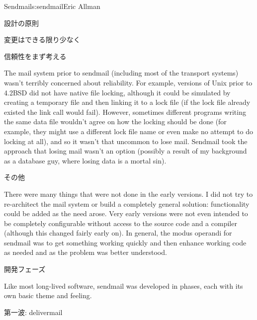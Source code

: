 \begin{aosachapter}{Sendmail}{s:sendmail}{Eric Allman}
\begin{aosasect1}{設計の原則}
\begin{aosasect2}{変更はできる限り少なく}
\end{aosasect2}

\begin{aosasect2}{信頼性をまず考える}

The mail system prior to sendmail (including most of the transport
systems) wasn't terribly concerned about reliability. For example,
versions of Unix prior to 4.2BSD did not have native file locking,
although it could be simulated by creating a temporary file and then
linking it to a lock file (if the lock file already existed the link
call would fail). However, sometimes different programs writing the
same data file wouldn't agree on how the locking should be done (for
example, they might use a different lock file name or even make no attempt
to do locking at all), and so it wasn't
that uncommon to lose mail.  Sendmail took the approach that losing
mail wasn't an option (possibly a result of my background as a
database guy, where losing data is a mortal sin).

\end{aosasect2}

\begin{aosasect2}{その他}

There were many things that were not done in the early versions.
I did not try to re-architect the mail system
or build a completely general solution:
functionality could be added as the need arose.
Very early versions were not even intended to be completely configurable
without access to the source code and a compiler
(although this changed fairly early on).
In general, the modus operandi for sendmail
was to get something working quickly
and then enhance working code as needed
and as the problem was better understood.

\end{aosasect2}

\end{aosasect1}

\begin{aosasect1}{開発フェーズ}

Like most long-lived software, sendmail was developed in phases, each
with its own basic theme and feeling.

\begin{aosasect2}{第一波: delivermail}


\end{aosasect2}
\end{aosasect1}
\end{aosachapter}
